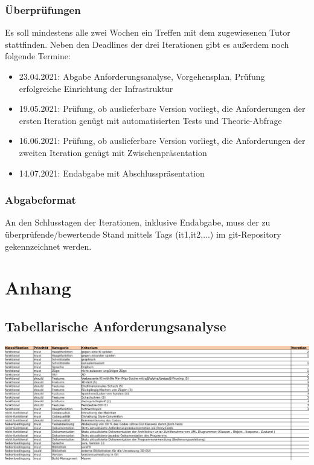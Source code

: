 \documentclass{scrreprt}
\begin{document}
\subsection{Überprüfungen}
Es soll mindestens alle zwei Wochen ein Treffen mit dem zugewiesenen Tutor stattfinden. Neben den Deadlines der drei Iterationen gibt es außerdem noch folgende Termine:

\begin{itemize}
\item 23.04.2021: Abgabe Anforderungsanalyse, Vorgehensplan, Prüfung erfolgreiche Einrichtung der Infrastruktur

\item 19.05.2021: Prüfung, ob auslieferbare Version vorliegt, die Anforderungen der ersten Iteration genügt mit automatisierten Tests und Theorie-Abfrage

\item 16.06.2021: Prüfung, ob auslieferbare Version vorliegt, die
Anforderungen der zweiten Iteration genügt mit Zwischenpräsentation

\item 14.07.2021: Endabgabe mit Abschlusspräsentation
\end{itemize}

\subsection{Abgabeformat}
An den Schlusstagen der Iterationen, inklusive Endabgabe, muss der zu überprüfende/bewertende Stand mittels Tags (it1,it2,...) im git-Repository gekennzeichnet werden.








\chapter{Anhang}
\section{Tabellarische Anforderungsanalyse}
\includegraphics{resources/anforderungsanalyse_tabelle.png}
\end{document}

